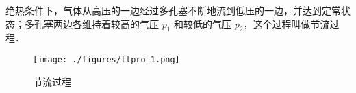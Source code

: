 

绝热条件下，气体从高压的一边经过多孔塞不断地流到低压的一边，并达到定常状态；多孔塞两边各维持着较高的气压 $p_1$ 和较低的气压 $p_2$，这个过程叫做节流过程．

\begin{figure}[ht]
\centering
\texttt{[image: ./figures/ttpro\_1.png]}
\caption{节流过程} \label{ttpro_fig1}
\end{figure}